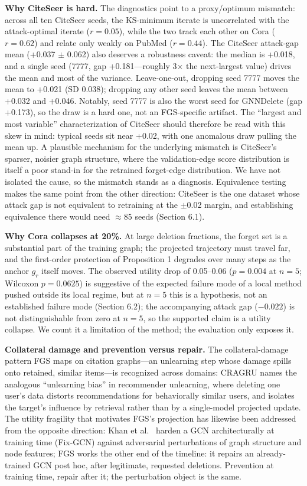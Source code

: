 \documentclass[pdflatex,sn-basic,Numbered]{sn-jnl}
\begin{document}
\textbf{Why CiteSeer is hard.} The diagnostics point to a proxy/optimum mismatch: across all ten CiteSeer seeds, the KS-minimum iterate is uncorrelated with the attack-optimal iterate ($r = 0.05$), while the two track each other on Cora ($r = 0.62$) and relate only weakly on PubMed ($r = 0.44$). The CiteSeer attack-gap mean (+0.037 $\pm$ 0.062) also deserves a robustness caveat: the median is +0.018, and a single seed (7777, gap +0.181---roughly 3$\times$ the next-largest value) drives the mean and most of the variance. Leave-one-out, dropping seed 7777 moves the mean to +0.021 (SD 0.038); dropping any other seed leaves the mean between +0.032 and +0.046. Notably, seed 7777 is also the worst seed for GNNDelete (gap +0.173), so the draw is a hard one, not an FGS-specific artifact. The ``largest and most variable'' characterization of CiteSeer should therefore be read with this skew in mind: typical seeds sit near +0.02, with one anomalous draw pulling the mean up. A plausible mechanism for the underlying mismatch is CiteSeer's sparser, noisier graph structure, where the validation-edge score distribution is itself a poor stand-in for the retrained forget-edge distribution. We have not isolated the cause, so the mismatch stands as a diagnosis. Equivalence testing makes the same point from the other direction: CiteSeer is the one dataset whose attack gap is not equivalent to retraining at the $\pm$0.02 margin, and establishing equivalence there would need $\approx$85 seeds (Section 6.1).

\textbf{Why Cora collapses at 20\%.} At large deletion fractions, the forget set is a substantial part of the training graph; the projected trajectory must travel far, and the first-order protection of Proposition 1 degrades over many steps as the anchor $g_r$ itself moves. The observed utility drop of 0.05--0.06 ($p = 0.004$ at $n = 5$; Wilcoxon $p = 0.0625$) is suggestive of the expected failure mode of a local method pushed outside its local regime, but at $n = 5$ this is a hypothesis, not an established failure mode (Section 6.2); the accompanying attack gap ($-0.022$) is not distinguishable from zero at $n = 5$, so the supported claim is a utility collapse. We count it a limitation of the method; the evaluation only exposes it.

\textbf{Collateral damage and prevention versus repair.} The collateral-damage pattern FGS maps on citation graphs---an unlearning step whose damage spills onto retained, similar items---is recognized across domains: CRAGRU \cite{cragu2025} names the analogous ``unlearning bias'' in recommender unlearning, where deleting one user's data distorts recommendations for behaviorally similar users, and isolates the target's influence by retrieval rather than by a single-model projected update. The utility fragility that motivates FGS's projection has likewise been addressed from the opposite direction: Khan et al.\ \cite{khan2026} harden a GCN architecturally at training time (Fix-GCN) against adversarial perturbations of graph structure and node features; FGS works the other end of the timeline: it repairs an already-trained GCN post hoc, after legitimate, requested deletions. Prevention at training time, repair after it; the perturbation object is the same.
\end{document}
